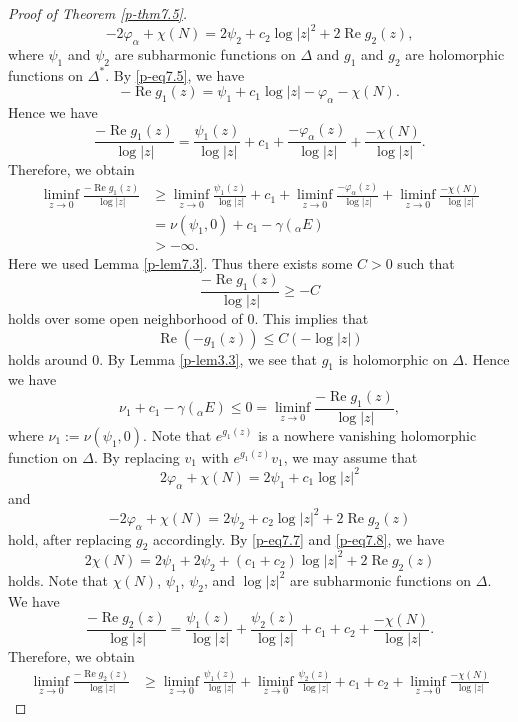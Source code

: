 \documentclass[10pt,a4paper]{amsart}
\DeclareMathOperator{\re}{Re}
\begin{document}
\begin{proof}[Proof of Theorem \ref{p-thm7.5}]
\begin{equation}
-2\varphi_\alpha +\chi (N)=2\psi_2+c_2\log |z|^2+2\re g_2(z), 
\end{equation} 
where $\psi_1$ and $\psi_2$ are subharmonic functions on $\Delta$ and 
$g_1$ and $g_2$ are holomorphic functions on $\Delta^*$. 
By \eqref{p-eq7.5}, we have 
\[
-\re g_1(z)=\psi_1+c_1\log |z|-\varphi_\alpha -\chi (N). 
\]
Hence we have 
\[
\frac{-\re g_1(z)}{\log |z|}=\frac{\psi_1(z)}{\log |z|}
+c_1+\frac{-\varphi_\alpha(z)}{\log |z|}
+\frac{-\chi(N)}{\log|z|}. 
\] 
Therefore, we obtain 
\[
\begin{split}
\liminf_{z\to 0}\frac{-\re g_1(z)}{\log |z|}&\geq 
\liminf_{z\to 0}\frac{\psi_1(z)}{\log |z|}
+c_1+\liminf_{z\to 0}\frac{-\varphi_\alpha(z)}{\log|z|}
+\liminf_{z\to 0}\frac{-\chi(N)}{\log|z|}
\\ &=\nu(\psi_1, 0)+c_1-\gamma({}_\alpha E) \\ 
&>-\infty. 
\end{split}
\] 
Here we used Lemma \ref{p-lem7.3}. 
Thus there exists some $C>0$ such that 
\[
\frac{-\re g_1(z)}{\log |z|}\geq -C
\] 
holds over some open neighborhood of $0$. 
This implies that 
\[
\re\left(-g_1(z)\right)\leq C\left(-\log |z|\right)
\] 
holds around $0$. 
By Lemma \ref{p-lem3.3}, we see that 
$g_1$ is holomorphic on $\Delta$. 
Hence we have 
\[\nu_1+c_1-\gamma ({}_\alpha E)\leq 0=\liminf_{z\to 0} \frac{-\re g_1(z)}{\log |z|}, 
\] 
where $\nu_1:=\nu(\psi_1, 0)$. 
Note that $e^{g_1(z)}$ is a nowhere vanishing holomorphic 
function on $\Delta$. 
By replacing $v_1$ with $e^{g_1(z)}v_1$,  
we may assume that
\begin{equation}\label{p-eq7.7}
2\varphi_\alpha + \chi(N) = 2\psi_1 + c_1 \log |z|^2
\end{equation}
and
\begin{equation}\label{p-eq7.8}
-2\varphi_\alpha + \chi(N) = 2\psi_2 + c_2 \log |z|^2 + 2\re g_2(z)
\end{equation}
hold, after replacing $g_2$ accordingly. 
By \eqref{p-eq7.7} and \eqref{p-eq7.8}, we have 
\[
2\chi (N)=2\psi_1+2\psi_2+(c_1+c_2)\log |z|^2+2\re g_2(z) 
\] 
holds. 
Note that $\chi(N)$, $\psi_1$, $\psi_2$, and $\log |z|^2$ are subharmonic 
functions on $\Delta$. 
We have 
\[
\frac{-\re g_2(z)}{\log |z|}=\frac{\psi_1(z)}{\log |z|}
+\frac{\psi_2(z)}{\log |z|}+c_1+c_2
+\frac{-\chi(N)}{\log|z|}. 
\] 
Therefore, we obtain 
\[
\begin{split}
\liminf_{z\to 0}\frac{-\re g_2(z)}{\log |z|}&\geq 
\liminf_{z\to 0}\frac{\psi_1(z)}{\log |z|}
+\liminf_{z\to 0}\frac{\psi_2(z)}{\log |z|}
+c_1+c_2
+\liminf_{z\to 0}\frac{-\chi(N)}{\log|z|}

\end{split}\]
\end{proof}
\end{document}
